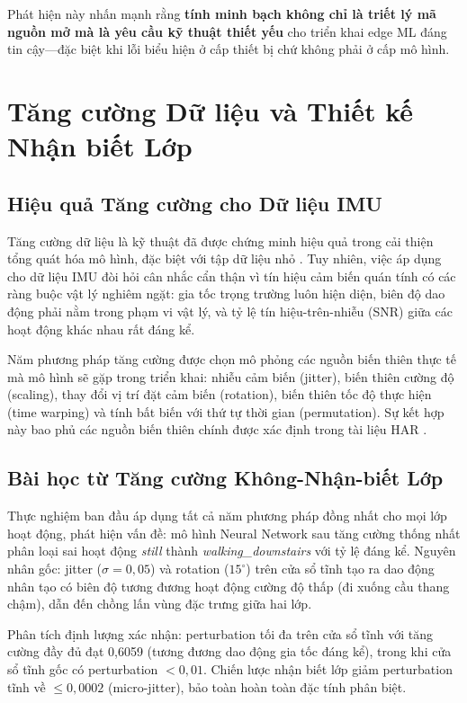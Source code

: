 Phát hiện này nhấn mạnh rằng \textbf{tính minh bạch không chỉ là triết lý mã nguồn mở mà là yêu cầu kỹ thuật thiết yếu} cho triển khai edge ML đáng tin cậy---đặc biệt khi lỗi biểu hiện ở cấp thiết bị chứ không phải ở cấp mô hình.

\section{Tăng cường Dữ liệu và Thiết kế Nhận biết Lớp}
\label{sec:augmentation_discussion}

\subsection{Hiệu quả Tăng cường cho Dữ liệu IMU}
Tăng cường dữ liệu là kỹ thuật đã được chứng minh hiệu quả trong cải thiện tổng quát hóa mô hình, đặc biệt với tập dữ liệu nhỏ \cite{um2017data, iwana2021empirical}. Tuy nhiên, việc áp dụng cho dữ liệu IMU đòi hỏi cân nhắc cẩn thận vì tín hiệu cảm biến quán tính có các ràng buộc vật lý nghiêm ngặt: gia tốc trọng trường luôn hiện diện, biên độ dao động phải nằm trong phạm vi vật lý, và tỷ lệ tín hiệu-trên-nhiễu (SNR) giữa các hoạt động khác nhau rất đáng kể.

Năm phương pháp tăng cường được chọn mô phỏng các nguồn biến thiên thực tế mà mô hình sẽ gặp trong triển khai: nhiễu cảm biến (jitter), biến thiên cường độ (scaling), thay đổi vị trí đặt cảm biến (rotation), biến thiên tốc độ thực hiện (time warping) và tính bất biến với thứ tự thời gian (permutation). Sự kết hợp này bao phủ các nguồn biến thiên chính được xác định trong tài liệu HAR \cite{eyobu2018feature, rashid2022ahar}.

\subsection{Bài học từ Tăng cường Không-Nhận-biết Lớp}
Thực nghiệm ban đầu áp dụng tất cả năm phương pháp đồng nhất cho mọi lớp hoạt động, phát hiện vấn đề: mô hình Neural Network sau tăng cường thống nhất phân loại sai hoạt động \textit{still} thành \textit{walking\_downstairs} với tỷ lệ đáng kể. Nguyên nhân gốc: jitter ($\sigma = 0{,}05$) và rotation ($15^{\circ}$) trên cửa sổ tĩnh tạo ra dao động nhân tạo có biên độ tương đương hoạt động cường độ thấp (đi xuống cầu thang chậm), dẫn đến chồng lấn vùng đặc trưng giữa hai lớp.

Phân tích định lượng xác nhận: perturbation tối đa trên cửa sổ tĩnh với tăng cường đầy đủ đạt 0,6059 (tương đương dao động gia tốc đáng kể), trong khi cửa sổ tĩnh gốc có perturbation $< 0{,}01$. Chiến lược nhận biết lớp giảm perturbation tĩnh về $\leq 0{,}0002$ (micro-jitter), bảo toàn hoàn toàn đặc tính phân biệt.

